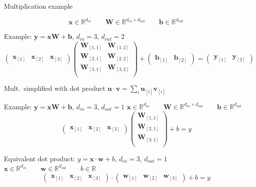 \documentclass[12pt,aspectratio=169,handout]{beamer}
\begin{document}
\begin{frame}{Multiplication example}
	
$$
\bm{x} \in \mathbb{R}^{d_{in}} \qquad
\bm{W} \in \mathbb{R}^{d_{in} \times d_{out}} \qquad
\bm{b} \in \mathbb{R}^{d_{out}}
$$


\begin{block}{Example: $\bm{y} = \bm{x} \bm{W} + \bm{b}$, $d_{in} = 3$, $d_{out} = 2$}
	$$
	\begin{pmatrix}
		\bm{x}_{[1]} & \bm{x}_{[2]} & \bm{x}_{[3]}
	\end{pmatrix}
	\begin{pmatrix}
		\bm{W}_{[1,1]} & \bm{W}_{[1,2]} \\
		\bm{W}_{[2,1]} & \bm{W}_{[2,2]} \\
		\bm{W}_{[3,1]} & \bm{W}_{[3,2]} \\
	\end{pmatrix}
	+
	\begin{pmatrix}
		\bm{b}_{[1]} & \bm{b}_{[2]}
	\end{pmatrix}
	=
	\begin{pmatrix}
		\bm{y}_{[1]} & \bm{y}_{[2]}
	\end{pmatrix}
	$$
\end{block}
	
\end{frame}



\begin{frame}{Mult.\ simplified with dot product $\bm{u} \cdot \bm{v} = \sum_i \bm{u}_{[i]} \bm{v}_{[i]}$}
	
\begin{block}{Example: $\bm{y} = \bm{x} \bm{W} + \bm{b}$, $d_{in} = 3$, $d_{out} = 1$}
$\bm{x} \in \mathbb{R}^{d_{in}} \qquad
\bm{W} \in \mathbb{R}^{d_{in} \times d_{out}} \qquad
\bm{b} \in \mathbb{R}^{d_{out}}$
	$$
	\begin{pmatrix}
		\bm{x}_{[1]} & \bm{x}_{[2]} & \bm{x}_{[3]}
	\end{pmatrix}
	\begin{pmatrix}
		\bm{W}_{[1,1]}  \\
		\bm{W}_{[2,1]}  \\
		\bm{W}_{[3,1]}  \\
	\end{pmatrix}
	+ b
	= y
	$$
\end{block}


\begin{block}{Equivalent dot product: $y = \bm{x} \cdot \bm{w} + b$, $d_{in} = 3$, $d_{out} = 1$}
$\bm{x} \in \mathbb{R}^{d_{in}} \qquad
\bm{w} \in \mathbb{R}^{d_{out}} \qquad
b \in \mathbb{R}$
	$$
	\begin{pmatrix}
		\bm{x}_{[1]} & \bm{x}_{[2]} & \bm{x}_{[3]}
	\end{pmatrix}
	\cdot
	\begin{pmatrix}
		\bm{w}_{[1]} & \bm{w}_{[2]} & \bm{w}_{[3]}
	\end{pmatrix}
	+ b
	= y
	$$
\end{block}

\end{frame}
\end{document}
